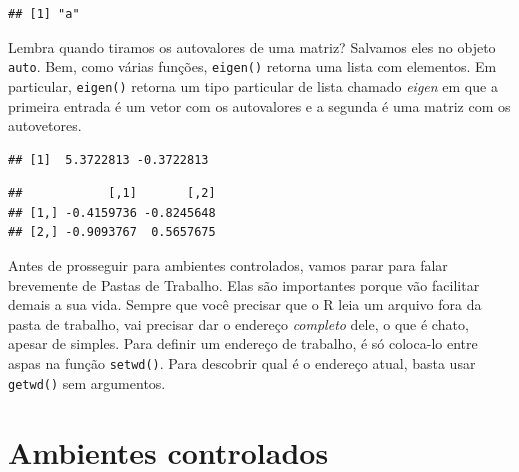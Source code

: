 \documentclass[
]{article}
\newenvironment{Shaded}{\begin{snugshade}}{\end{snugshade}}
\newcommand{\NormalTok}[1]{#1}
\newcommand{\OperatorTok}[1]{\textcolor[rgb]{0.81,0.36,0.00}{\textbf{#1}}}
\begin{document}
\begin{Shaded}
\end{Shaded}

\begin{verbatim}
## [1] "a"
\end{verbatim}

Lembra quando tiramos os autovalores de uma matriz? Salvamos eles no
objeto \texttt{auto}. Bem, como várias funções, \texttt{eigen()} retorna
uma lista com elementos. Em particular, \texttt{eigen()} retorna um tipo
particular de lista chamado \emph{eigen} em que a primeira entrada é um
vetor com os autovalores e a segunda é uma matriz com os autovetores.

\begin{Shaded}
\end{Shaded}

\begin{verbatim}
## [1]  5.3722813 -0.3722813
\end{verbatim}

\begin{Shaded}
\end{Shaded}

\begin{verbatim}
##            [,1]       [,2]
## [1,] -0.4159736 -0.8245648
## [2,] -0.9093767  0.5657675
\end{verbatim}

Antes de prosseguir para ambientes controlados, vamos parar para falar
brevemente de Pastas de Trabalho. Elas são importantes porque vão
facilitar demais a sua vida. Sempre que você precisar que o R leia um
arquivo fora da pasta de trabalho, vai precisar dar o endereço
\emph{completo} dele, o que é chato, apesar de simples. Para definir um
endereço de trabalho, é só coloca-lo entre aspas na função
\texttt{setwd()}. Para descobrir qual é o endereço atual, basta usar
\texttt{getwd()} sem argumentos.

\hypertarget{ambientes-controlados}{%
\section{Ambientes controlados}\label{ambientes-controlados}}
\end{document}
